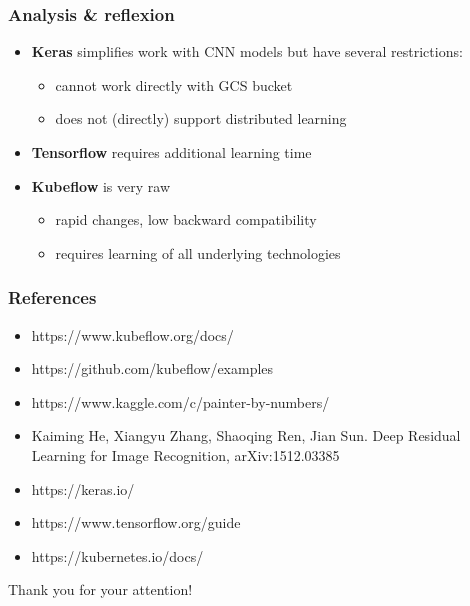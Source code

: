 \documentclass[aspectratio=169]{beamer}
\begin{document}
\begin{frame}
\frametitle{Analysis \& reflexion}

\begin{itemize}
	\item \textbf{Keras} simplifies work with CNN models but have several restrictions:
	\begin{itemize}
		\item cannot work directly with GCS bucket
		\item does not (directly) support distributed learning
	\end{itemize}
	\item \textbf{Tensorflow} requires additional learning time
	\item \textbf{Kubeflow} is very raw
	\begin{itemize}
		\item rapid changes, low backward compatibility
		\item requires learning of all underlying technologies 
	\end{itemize}
\end{itemize}

\end{frame}


\begin{frame}
\frametitle{References}

\begin{itemize}
	\item https://www.kubeflow.org/docs/
	\item https://github.com/kubeflow/examples
	\item https://www.kaggle.com/c/painter-by-numbers/
	\item Kaiming He, Xiangyu Zhang, Shaoqing Ren, Jian Sun. Deep Residual Learning for Image Recognition, arXiv:1512.03385
	\item https://keras.io/
	\item https://www.tensorflow.org/guide
	\item https://kubernetes.io/docs/
	
\end{itemize}

\end{frame}


\begin{frame}
\Huge{\centerline{Thank you for your attention!}}\end{frame}
\end{document}
